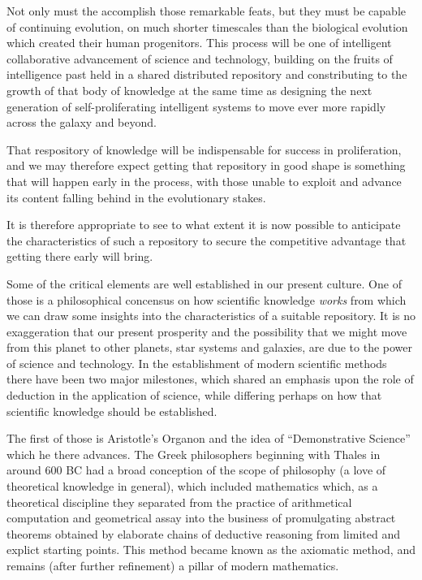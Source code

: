 \documentclass[10pt,titlepage]{book}
\begin{document}
Not only must the accomplish those remarkable feats, but they must be capable of continuing evolution, on much shorter timescales than the biological evolution which created their human progenitors.
This process will be one of intelligent collaborative advancement of science and technology, building on the fruits of intelligence past held in a shared distributed repository and constributing to the growth of that body of knowledge at the same time as designing the next generation of self-proliferating intelligent systems to move ever more rapidly across the galaxy and beyond.

That respository of knowledge will be indispensable for success in proliferation, and we may therefore expect getting that repository in good shape is something that will happen early in the process, with those unable to exploit and advance its content falling behind in the evolutionary stakes.

It is therefore appropriate to see to what extent it is now possible to anticipate the characteristics of such a repository to secure the competitive advantage that getting there early will bring.

Some of the critical elements are well established in our present culture.
One of those is a philosophical concensus on how scientific knowledge \emph{works} from which we can draw some insights into the characteristics of a suitable repository.
It is no exaggeration that our present prosperity and the possibility that we might move from this planet to other planets, star systems and galaxies, are due to the power of science and technology.
In the establishment of modern scientific methods there have been two major milestones, which shared an emphasis upon the role of deduction in the application of science, while differing perhaps on how that scientific knowledge should be established.

The first of those is Aristotle's Organon and the idea of ``Demonstrative Science'' which he there advances.
The Greek philosophers beginning with Thales in around 600 BC had a broad conception of the scope of philosophy (a love of theoretical knowledge in general), which included mathematics which, as a theoretical discipline they separated from the practice of arithmetical computation and geometrical assay into the business of promulgating abstract theorems obtained by elaborate chains of deductive reasoning from limited and explict starting points.
This method became known as the axiomatic method, and remains (after further refinement) a pillar of modern mathematics.
\end{document}
